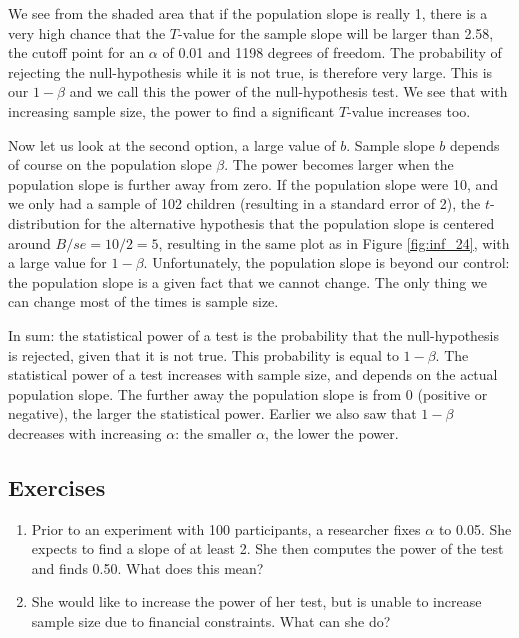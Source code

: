 \documentclass[]{report}\usepackage[]{graphicx}\usepackage[]{color}
\begin{document}
We see from the shaded area that if the population slope is really 1, there is a very high chance that the $T$-value for the sample slope will be larger than 2.58, the cutoff point for an $\alpha$ of 0.01 and 1198 degrees of freedom. The probability of rejecting the null-hypothesis while it is not true, is therefore very large. This is our $1-\beta$ and we call this the power of the null-hypothesis test. We see that with increasing sample size, the power to find a significant $T$-value increases too.

Now let us look at the second option, a large value of $b$. Sample slope $b$ depends of course on the population slope $\beta$. The power becomes larger when the population slope is further away from zero. If the population slope were 10, and we only had a sample of 102 children (resulting in a standard error of 2), the $t$-distribution for the alternative hypothesis that the population slope is centered around $B/se=10/2=5$, resulting in the same plot as in Figure \ref{fig:inf_24}, with a large value for $1-\beta$. Unfortunately, the population slope is beyond our control: the population slope is a given fact that we cannot change. The only thing we can change most of the times is sample size. 

In sum: the statistical power of a test is the probability that the null-hypothesis is rejected, given that it is not true. This probability is equal to $1-\beta$. The statistical power of a test increases with sample size, and depends on the actual population slope. The further away the population slope is from 0 (positive or negative), the larger the statistical power. Earlier we also saw that $1-\beta$ decreases with increasing $\alpha$: the smaller $\alpha$, the lower the power.


\subsection{Exercises}


\begin{enumerate}

\item Prior to an experiment with 100 participants, a researcher fixes $\alpha$ to 0.05. She expects to find a slope of at least 2. She then computes the power of the test and finds 0.50. What does this mean?

\item She would like to increase the power of her test, but is unable to increase sample size due to financial constraints. What can she do?


\end{enumerate}
\end{document}
